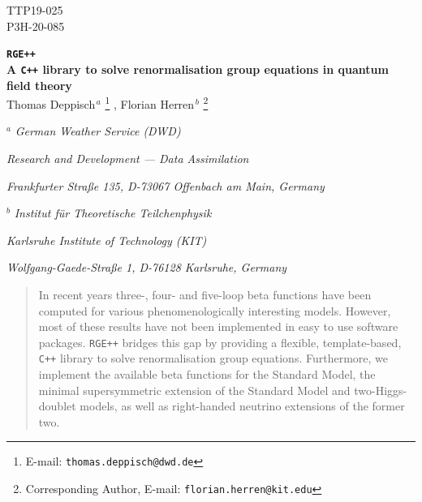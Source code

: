 \documentclass[11pt,a4paper]{article}
\begin{document}
\lstset{style=cpp}

\begin{titlepage}

\vspace*{-15mm}
\begin{flushright}
TTP19-025\\
P3H-20-085
\end{flushright}
\vspace*{0.7cm}


\begin{center}
{ \bf\LARGE \texttt{RGE++}\\ A \texttt{C++} library to solve renormalisation group equations in quantum field theory}
\\[8mm]
Thomas Deppisch$^{\, a}$ \footnote{E-mail: \texttt{thomas.deppisch@dwd.de}} ,
Florian Herren$^{\, b}$ \footnote{Corresponding Author, E-mail: \texttt{florian.herren@kit.edu}}
\\[1mm]
\end{center}
\vspace*{0.50cm}
\centerline{$^{a}$ \it German Weather Service (DWD)}
\centerline{\it Research and Development --- Data Assimilation}
\centerline{\it Frankfurter Stra\ss{}e 135, D-73067 Offenbach am Main, Germany}
\vspace*{0.2cm}
\centerline{$^{b}$ \it Institut f\"ur Theoretische Teilchenphysik}
\centerline{\it Karlsruhe Institute of Technology (KIT)}
\centerline{\it Wolfgang-Gaede-Stra\ss{}e 1, D-76128 Karlsruhe, Germany}
\vspace*{0.2cm}

\begin{abstract}
In recent years three-, four- and five-loop beta functions have been computed for various phenomenologically interesting models.
However, most of these results have not been implemented in easy to use software packages. \texttt{RGE++} bridges
this gap by providing a flexible, template-based, \texttt{C++} library to solve renormalisation group equations.
Furthermore, we implement the available beta functions for the Standard Model, the minimal supersymmetric
extension of the Standard Model and two-Higgs-doublet models, as well as right-handed neutrino extensions of the former two.
\end{abstract}

\end{titlepage}

\setcounter{footnote}{0}
\end{document}
